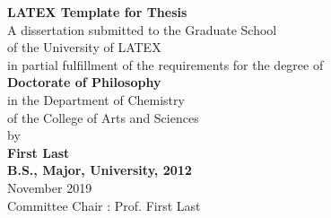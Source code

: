 \begin{titlepage}
    \begin{center}
        \textbf{\Huge LATEX Template for Thesis}\\
        \vspace{1.0cm}
        \Large
        A dissertation submitted to the Graduate School\\
        of the University of LATEX \\
        in partial fulfillment of the requirements for the degree of \\
        \vspace{1.0cm}
        \textbf{Doctorate of Philosophy }\\
        \vspace{1.0cm}
        in the Department of Chemistry \\
        of the College of Arts and Sciences \\
        by \\
        \vspace{1.0cm}
        \textbf{First Last} \\
        \vspace{1.0cm}
        \textbf{B.S., Major, University, 2012} \\
        \vspace{1.0cm}
        November 2019 \\
        \vspace{1.0cm}
        Committee Chair : Prof. First Last
    \end{center}
\end{titlepage}
